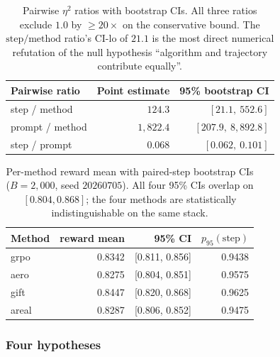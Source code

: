 \documentclass{article}  \usepackage[preprint,nonatbib]{neurips_2026} \usepackage[numbers]{natbib}
\begin{document}
\begin{table}[h]
\centering
\small
\begin{tabular}{lrr}
\toprule
\textbf{Pairwise ratio} & \textbf{Point estimate} & 95\% bootstrap CI \\
\midrule
step / method     & $124.3$ & $[21.1,\ 552.6]$ \\
prompt / method   & $1{,}822.4$ & $[207.9,\ 8{,}892.8]$ \\
step / prompt     & $0.068$ & $[0.062,\ 0.101]$ \\
\bottomrule
\end{tabular}
\caption{Pairwise $\eta^2$ ratios with bootstrap CIs. All three ratios
exclude $1.0$ by $\geq 20\times$ on the conservative bound. The
$\text{step}/\text{method}$ ratio's CI-lo of $21.1$ is the most
direct numerical refutation of the null hypothesis ``algorithm and
trajectory contribute equally''.}
\label{tab:p5-iter141-ratios}
\end{table}

\begin{table}[h]
\centering
\small
\begin{tabular}{lrrr}
\toprule
\textbf{Method} & \textbf{reward mean} & 95\% CI & $p_{95}(\text{step})$ \\
\midrule
grpo  & 0.8342 & [0.811, 0.856] & 0.9438 \\
aero  & 0.8275 & [0.804, 0.851] & 0.9575 \\
gift  & 0.8447 & [0.820, 0.868] & 0.9625 \\
areal & 0.8287 & [0.806, 0.852] & 0.9475 \\
\bottomrule
\end{tabular}
\caption{Per-method reward mean with paired-step bootstrap CIs
($B = 2{,}000$, seed $20260705$). All four 95\% CIs overlap on
$[0.804, 0.868]$; the four methods are statistically indistinguishable
on the same stack.}
\label{tab:p5-iter141-method-reward}
\end{table}

\subsubsection{Four hypotheses}
\end{document}
